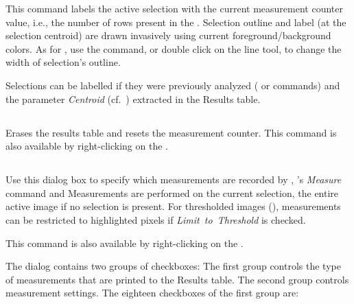 This command labels the active selection with the current measurement
counter value, i.e., the number of rows present in the .
Selection outline and label (at the selection centroid) are drawn
invasively using current foreground/background colors. As for ,
use the 
command, or double click on the line tool, to change the width of
selection's outline.

Selections can be labelled if they were previously analyzed (
or  commands) and the
parameter \emph{Centroid} (cf.\ )
extracted in the Results table.




\subsection{\protect{}\label{sub:Clear-Results}}

Erases the results table and resets the measurement counter. This
command is also available by right-clicking on the .


\subsection[\protect\userinterface{Set Measurements\ldots{}}]{\protect{}\label{sub:Set-Measurements...}\improvement{}}

Use this dialog box to specify which measurements are recorded by
, 's
\emph{Measure} command and 
Measurements are performed on the current selection, the entire active
image if no selection is present. For thresholded images (),
measurements can be restricted to highlighted pixels if \emph{Limit\ to\ Threshold
}is checked. 

This command is also available by right-clicking on the . 

The dialog contains two groups of checkboxes: The first group controls
the type of measurements that are printed to the Results table. The
second group controls measurement settings. The eighteen checkboxes
of the first group are:

